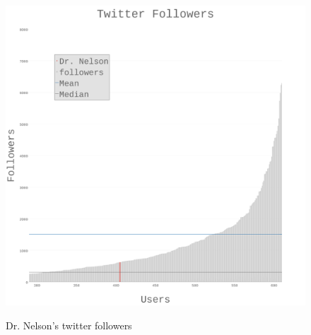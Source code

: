 \documentclass[12pt, a4paper]{article}
\begin{document}
\begin{figure}[p]
    \centering
    \href{http://datenstrom.gitlab.io/cs532-s17/notebooks/followers.html}{
    \includegraphics[width=\textwidth]{dia/followers_half.png}
    }
    \label{fig:followers-half}
    \caption{Dr. Nelson's twitter followers}
\end{figure}
\end{document}
